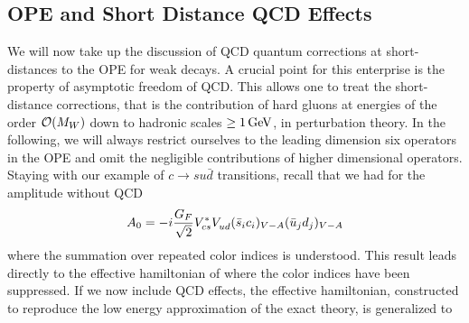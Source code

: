\subsection{OPE and Short Distance QCD Effects}
            \label{sec:basicform:ope}
We will now take up the discussion of QCD quantum corrections at
short-distances to the OPE for weak decays. A crucial point for this
enterprise is the property of asymptotic freedom of QCD. This allows
one to treat the short-distance corrections, that is the contribution
of hard gluons at energies of the order ${\cal O}(M_W)$ down to hadronic
scales $\ge 1\, {\rm GeV}$, in perturbation theory. In the following, we will
always restrict ourselves to the leading dimension six operators in
the OPE and omit the negligible contributions of higher dimensional
operators. Staying with our example of $c\to su\bar d$ transitions,
recall that we had for the amplitude without QCD
\begin{equation}\label{amp0}
A_0=-i{G_F\over\sqrt{2}}V^*_{cs}V_{ud}^{}
  (\bar s_ic_i)_{V-A}(\bar u_jd_j)_{V-A}
\end{equation}
where the summation over repeated color indices is understood.  This
result leads directly to the effective hamiltonian of  where the
color indices have been suppressed. If we now include QCD effects, the
effective hamiltonian, constructed to reproduce the low energy
approximation of the exact theory, is generalized to

